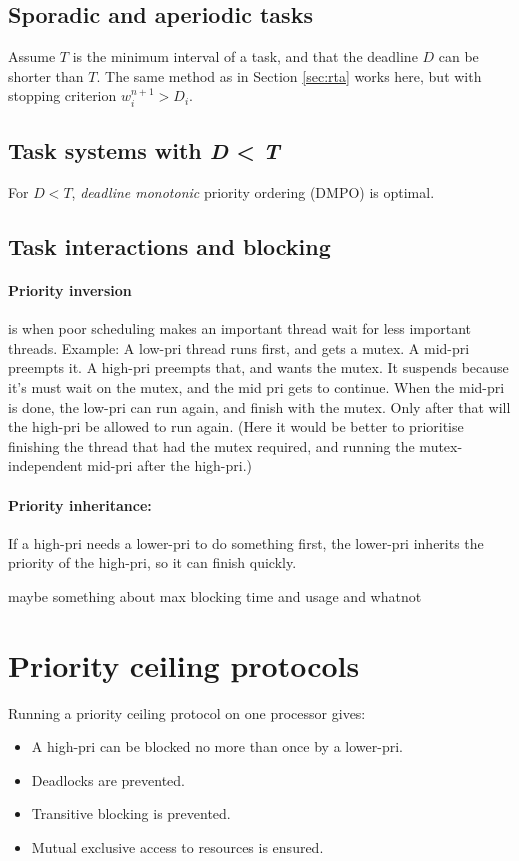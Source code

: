 \documentclass[a4paper, 12pt]{article}
\newcommand{\comment}[1]{\textcolor{RedOrange}{#1}}
\begin{document}
\subsection{Sporadic and aperiodic tasks}
Assume \(T\) is the minimum interval of a task, and that the deadline \(D\) can be shorter than \(T\). The same method as in Section \ref{sec:rta} works here, but with stopping criterion \(w_i^{n+1} > D_i\).

\subsection{Task systems with \emph{D} < \emph{T}}
For \(D < T\), \emph{deadline monotonic} priority ordering (DMPO) is optimal.

\subsection{Task interactions and blocking}
\paragraph{Priority inversion} is when poor scheduling makes an important thread wait for less important threads. Example: A low-pri thread runs first, and gets a mutex. A mid-pri preempts it. A high-pri preempts that, and wants the mutex. It suspends because it's must wait on the mutex, and the mid pri gets to continue. When the mid-pri is done, the low-pri can run again, and finish with the mutex. Only after that will the high-pri be allowed to run again. (Here it would be better to prioritise finishing the thread that had the mutex required, and running the mutex-independent mid-pri after the high-pri.)
\paragraph{Priority inheritance:} If a high-pri needs a lower-pri to do something first, the lower-pri inherits the priority of the high-pri, so it can finish quickly.

\comment{maybe something about max blocking time and usage and whatnot}

\section{Priority ceiling protocols}
Running a priority ceiling protocol on one processor gives:
\begin{itemize}
	\item A high-pri can be blocked no more than once by a lower-pri.
	\item Deadlocks are prevented.
	\item Transitive blocking is prevented.
	\item Mutual exclusive access to resources is ensured.
\end{itemize}
\end{document}
